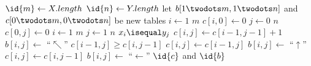 \begin{codebox}
\li $\id{m} \gets X.length$
\li $\id{n} \gets Y.length$
\li let $b[1 \twodots m, 1 \twodots n]$ and $c[0 \twodots m, 0 \twodots n]$  be new tables
\li \For $i \gets 1$ \To $m$ \Do
\li $c[i,0] \gets 0$ \End
\li \For $j \gets 0$ \To $n$ \Do
\li $c[0,j] \gets 0$ \End
\li \For $i \gets 1$ \To $m$ \Do
\li \For $j \gets 1$ \To $n$ \Do
\li \If $x_i \isequal y_j$ \Then
\li $c[i,j] \gets c[i-1,j-1]+1$
\li $b[i,j] \gets$ ``$\nwarrow$''
\li \ElseIf $c[i-1,j] \geq c[i,j-1]$ \Then
\li $c[i,j] \gets c[i-1,j]$
\li $b[i,j] \gets$ ``$\uparrow$''
\li \ElseNoIf $c[i,j] \gets c[i,j-1]$
\li $b[i,j] \gets$ ``$\leftarrow$'' \End \End \End
\li \Return $\id{c}$ and $\id{b}$
\end{codebox}